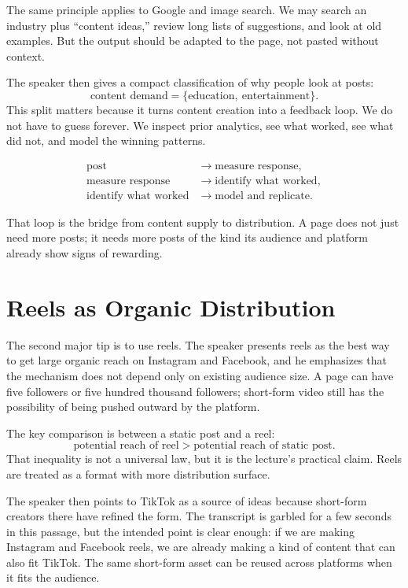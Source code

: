 The same principle applies to Google and image search. We may search an industry plus ``content ideas,'' review long lists of suggestions, and look at old examples. But the output should be adapted to the page, not pasted without context.

The speaker then gives a compact classification of why people look at posts:
\begin{equation}
\text{content demand}
=
\{\text{education},\ \text{entertainment}\}.
\end{equation}
This split matters because it turns content creation into a feedback loop. We do not have to guess forever. We inspect prior analytics, see what worked, see what did not, and model the winning patterns.

\begin{align}
\text{post} &\longrightarrow \text{measure response},\\
\text{measure response} &\longrightarrow \text{identify what worked},\\
\text{identify what worked} &\longrightarrow \text{model and replicate}.
\end{align}

That loop is the bridge from content supply to distribution. A page does not just need more posts; it needs more posts of the kind its audience and platform already show signs of rewarding.

\section{Reels as Organic Distribution}

The second major tip is to use reels. The speaker presents reels as the best way to get large organic reach on Instagram and Facebook, and he emphasizes that the mechanism does not depend only on existing audience size. A page can have five followers or five hundred thousand followers; short-form video still has the possibility of being pushed outward by the platform.

The key comparison is between a static post and a reel:
\begin{equation}
\text{potential reach of reel}
>
\text{potential reach of static post}.
\end{equation}
That inequality is not a universal law, but it is the lecture's practical claim. Reels are treated as a format with more distribution surface.

The speaker then points to TikTok as a source of ideas because short-form creators there have refined the form. The transcript is garbled for a few seconds in this passage, but the intended point is clear enough: if we are making Instagram and Facebook reels, we are already making a kind of content that can also fit TikTok. The same short-form asset can be reused across platforms when it fits the audience.

